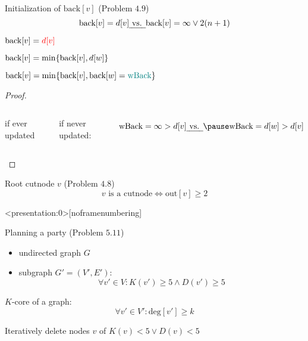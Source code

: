 \begin{frame}{}
  \begin{exampleblock}{Initialization of $\text{back}[v]$ (Problem $4.9$)}
    \[
      \text{back}[v] = d[v] \text{\emph{ vs. }} \text{back}[v] = \infty \lor 2(n+1) 
    \]
  \end{exampleblock}

  \pause
  \vspace{0.30cm}
  \begin{description}
    \item[tree edge ($\to v$):]   $\text{back}[v] = \textcolor{red}{d[v]}$
    \item[back edge ($v \to w$):] $\text{back}[v] = \min \{\text{back}[v], d[w]\}$
    \item[backtracking from $w$:] $\text{back}[v] = \min \{\text{back}[v], \text{back}[w] = \textcolor{teal}{\text{wBack}}\}$
  \end{description}

  \pause
  \begin{proof}
    \begin{columns}
	\centerline{if ever updated}
	\pause
	\centerline{if never updated:}
	\pause
	\[
	  \text{wBack} = \infty > d[v] \text{\emph{ vs. }} \pause \text{wBack} = d[w] > d[v]
	\]
    \end{columns}
    \vspace{-0.50cm}
  \end{proof}
\end{frame}
\begin{frame}{}
  \begin{exampleblock}{Root cutnode $v$ (Problem $4.8$)}
    \[
      v \text{ is a cutnode} \iff \text{out}[v] \ge 2
    \]
  \end{exampleblock}

  \pause
\end{frame}
\begin{frame}<presentation:0>[noframenumbering]
  \begin{exampleblock}{Planning a party (Problem $5.11$)}
	\begin{itemize}
	  \item undirected graph $G$
	  \item subgraph $G' = (V', E')$:
		\[
		  \forall v' \in V: K(v') \ge 5 \land D(v') \ge 5
		\]
	\end{itemize}
  \end{exampleblock}

  \pause
  \vspace{0.50cm}
  $K$-core of a graph:
  \[
    \forall v' \in V': \text{deg}[v'] \ge k
  \]

  \pause
  \vspace{0.50cm}
  \centerline{Iteratively delete nodes $v$ of $K(v) < 5 \lor D(v) < 5$}
\end{frame}
